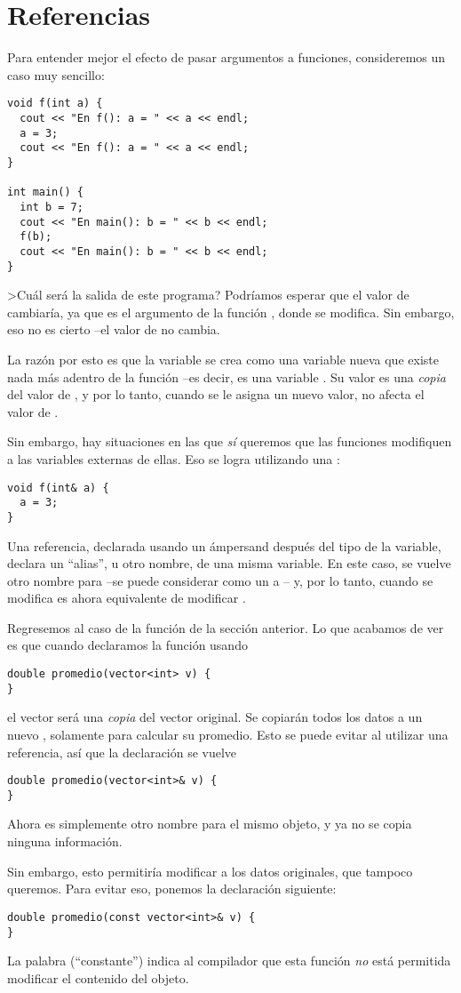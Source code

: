 \section{Referencias}
Para entender mejor el efecto de pasar argumentos a funciones, consideremos un
caso muy sencillo:
\begin{lstlisting}
void f(int a) {
  cout << "En f(): a = " << a << endl;
  a = 3;
  cout << "En f(): a = " << a << endl;
}

int main() {
  int b = 7;
  cout << "En main(): b = " << b << endl;
  f(b);
  cout << "En main(): b = " << b << endl;
}
\end{lstlisting}
>Cuál será la salida de este programa? Podríamos esperar que el valor de
 cambiaría, ya que es el argumento de la función , donde se
modifica. Sin embargo, eso no es cierto --el valor de  no cambia.

La razón por esto es que la variable  se crea como una variable nueva
que existe nada más adentro de la función  --es decir, es una variable
. Su valor es una \emph{copia} del valor de , y por lo 
tanto, cuando se le asigna un nuevo valor, no afecta el valor de .

Sin embargo, hay situaciones en las que \emph{sí} queremos que las funciones
modifiquen a las variables externas de ellas. Eso se logra utilizando una
:
\begin{lstlisting}
void f(int& a) {
  a = 3;
}
\end{lstlisting}
Una referencia, declarada usando un ámpersand \inl{&} después del tipo de
la variable, declara un ``alias'', u otro nombre, de una misma variable. En
este caso,  se vuelve otro nombre para  --se puede considerar
como un  a -- y, por lo tanto, cuando se modifica 
es ahora equivalente de modificar .

Regresemos al caso de la función  de la sección anterior.  Lo que
acabamos de ver es que cuando declaramos la función usando
\begin{lstlisting}
double promedio(vector<int> v) {
}
\end{lstlisting}
el vector  será una \emph{copia} del vector original. Se copiarán todos
los datos a un nuevo , solamente para calcular su promedio. Esto se
puede evitar al utilizar una referencia, así que la declaración se vuelve
\begin{lstlisting}
double promedio(vector<int>& v) {
}
\end{lstlisting}
Ahora  es simplemente otro nombre para el mismo objeto, y ya no se copia
ninguna información.

Sin embargo, esto permitiría modificar a los datos originales, que tampoco
queremos. Para evitar eso, ponemos la declaración siguiente:
\begin{lstlisting}
double promedio(const vector<int>& v) {
}
\end{lstlisting}
La palabra  (``constante'') indica al compilador que esta función
\emph{no} está permitida modificar el contenido del objeto.






